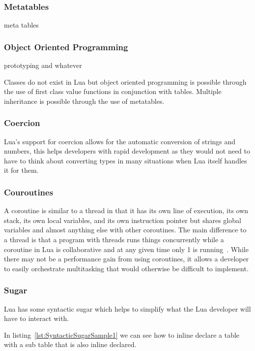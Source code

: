 \documentclass[11pt,a4paper,titlepage]{article}
\begin{document}
\subsubsection{Metatables}
	meta tables

\subsubsection{Object Oriented Programming}
	prototyping and whatever

	Classes do not exist in Lua but object oriented programming is possible through the use of first class value functions in conjunction with tables. Multiple inheritance is possible through the use of metatables.

\subsubsection{Coercion}
	Lua's support for coercion allows for the automatic conversion of strings and numbers, this helps developers with rapid development as they would not need to have to think about converting types in many situations when Lua itself handles it for them.

\subsubsection{Couroutines}
	A coroutine is similar to a thread in that it has its own line of execution, its own stack, its own local variables, and its own instruction pointer but shares global variables and almost anything else with other coroutines. The main difference to a thread is that a program with threads runs things concurrently while a coroutine in Lua is collaborative and at any given time only 1 is running~\cite{Ierusalimschy:2013:PLT:2502646}. While there may not be a performance gain from using coroutines, it allows a developer to easily orchestrate multitasking that would otherwise be difficult to implement.

\subsubsection{Sugar}
	Lua has some syntactic sugar which helps to simplify what the Lua developer will have to interact with.

	
	In listing~\ref{lst:SyntacticSugarSample1} we can see how to inline declare a table with a sub table that is also inline declared.
\end{document}
